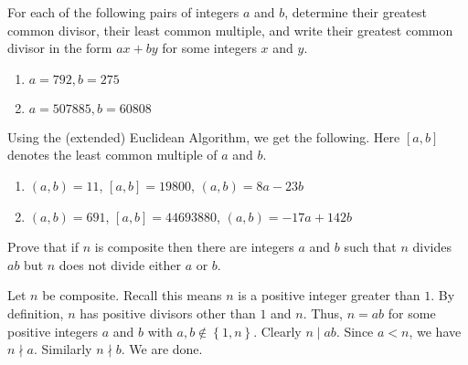 \def\thetitle{Homework 1}



\begin{questions}

\question
  For each of the following pairs of integers \(a\) and \(b\), determine their greatest common divisor, their least common multiple, and write their greatest common divisor in the form \(a x+b y\) for some integers \(x\) and \(y\).
  \begin{enumerate}[label=(\alph*)]
    \item \(a=792, b=275\)
    \item \(a=507885, b=60808\)
  \end{enumerate} 

\begin{solution} Using the (extended) Euclidean Algorithm, we get the following. Here \([a,b]\) denotes the least common multiple of \(a\) and \(b\).
    \begin{enumerate}[label=(\alph*)]
        \item \((a,b) = 11\), \([a,b] = 19800\), \((a,b)= 8a - 23b\)
        \item \((a,b) = 691\), \([a,b] = 44693880\), \((a,b)= -17a +142b\)
    \end{enumerate}
\end{solution}


\question
    Prove that if \({n}\) is composite then there are integers \(a\) and \(b\) such that \(n\) divides \(a b\) but \(n\) does not divide either \(a\) or \(b\).

\begin{theproof}
    Let \(n\) be composite. Recall this means \(n\) is a positive integer greater than \(1\). By definition, \(n\) has positive divisors other than \(1\) and \(n\). Thus, \(n=a b\) for some positive integers \(a\) and \(b\) with \(a,b\notin \left\{ 1,n \right\}\). Clearly \(n \mid a b\).
    Since \(a < n\), we have \(n\nmid a\). Similarly \(n\nmid b\). We are done.
\end{theproof}


\end{questions}
